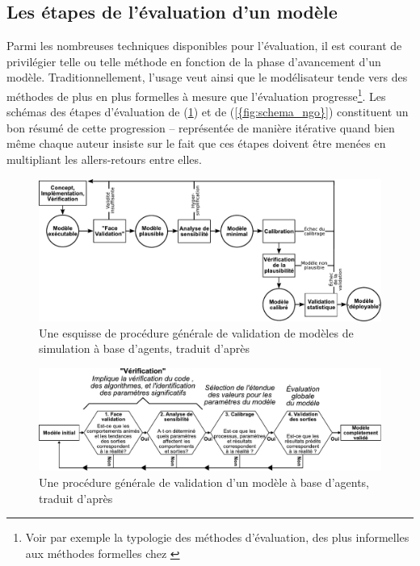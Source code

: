 \clearpage

\subsection{Les étapes de l'évaluation d'un modèle}

Parmi les nombreuses techniques disponibles pour l'évaluation, il est courant de privilégier telle ou telle méthode en fonction de la phase d'avancement d'un modèle.
Traditionnellement, l'usage veut ainsi que le modélisateur tende vers des méthodes de plus en plus formelles à mesure que l'évaluation progresse\footnote{
	Voir par exemple la typologie des méthodes d'évaluation, des plus \og informelles \fg{} aux méthodes \og formelles \fg{} chez \textcite[figure 3, p. 131]{balci_validation_1994}}.
Les schémas des étapes d'évaluation de \citeauthor{klugl_validation_2008} (\cref{fig:schema_kluegl}) et de \citeauthor{ngo_calibration_2012} (\cref{{fig:schema_ngo}}) constituent un bon résumé de cette progression -- représentée de manière itérative quand bien même chaque auteur insiste sur le fait que ces étapes doivent être menées en multipliant les allers-retours entre elles.

\begin{figure}[H]
	\center
	\includegraphics[width=\linewidth]{img/schema_kluegl_traduit.pdf}
	\caption[Une esquisse de procédure générale de validation de modèles de simulation à base d'agents.]{Une esquisse de procédure générale de validation de modèles de simulation à base d'agents, traduit d'après \textcite[fig. 1 p. 42]{klugl_validation_2008}}
	\label{fig:schema_kluegl}
\end{figure}
\bigskip
\begin{figure}[H]
	\center
	\includegraphics[width=\linewidth]{img/schema_ngo.pdf}
	\caption[Procédure générale de validation d'un modèle à base d'agents.]{Une procédure générale de validation d'un modèle à base d'agents, traduit d'après \textcite[fig. 10.1 p. 183]{ngo_calibration_2012}}
	\label{fig:schema_ngo}
\end{figure}


